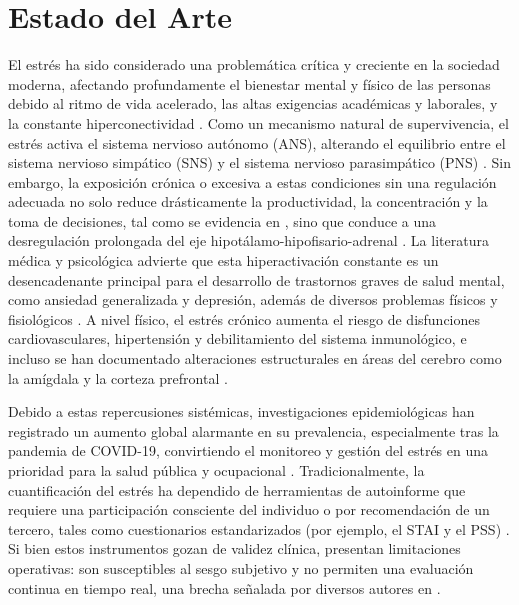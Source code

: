 \chapter{Estado del Arte}

El estrés ha sido considerado una problemática crítica y creciente en la sociedad moderna, afectando profundamente el 
bienestar mental y físico de las personas debido al ritmo de vida acelerado, las altas exigencias académicas y laborales, 
y la constante hiperconectividad \cite{mouadili2025advancing}. Como un mecanismo natural de supervivencia, el estrés activa 
el sistema nervioso autónomo (ANS), alterando el equilibrio entre el sistema nervioso simpático (SNS) y el sistema nervioso 
parasimpático (PNS) \cite{fontes2024enhancing, tao2025emotion_facial}. Sin embargo, la exposición crónica o excesiva a estas
 condiciones sin una regulación adecuada no solo reduce drásticamente la productividad, la concentración y la toma de 
 decisiones, tal como se evidencia en \cite{chatzaki2025overview, mouadili2025advancing}, sino que conduce a una 
 desregulación prolongada del eje hipotálamo-hipofisario-adrenal \cite{chatzaki2025overview}.
La literatura médica y psicológica advierte que esta hiperactivación constante es un desencadenante principal para el 
desarrollo de trastornos graves de salud mental, como ansiedad generalizada y depresión, además de diversos problemas 
físicos y fisiológicos \cite{chatzaki2025overview, mouadili2025advancing, singh2023stress_multi}. A nivel físico, el estrés 
crónico aumenta el riesgo de disfunciones cardiovasculares, hipertensión y debilitamiento del sistema inmunológico, e 
incluso se han documentado alteraciones estructurales en áreas del cerebro como la amígdala y la corteza prefrontal 
\cite{chatzaki2025overview, fontes2024enhancing, mouadili2025advancing, khomidov2024realtime}.

Debido a estas repercusiones sistémicas, investigaciones epidemiológicas han registrado un aumento global alarmante en su 
prevalencia, especialmente tras la pandemia de COVID-19, convirtiendo el monitoreo y gestión del estrés en una prioridad 
para la salud pública y ocupacional \cite{chatzaki2025overview}. Tradicionalmente, la cuantificación del estrés ha dependido 
de herramientas de autoinforme que requiere una participación consciente del individuo o por recomendación de un tercero, tales como cuestionarios estandarizados 
(por ejemplo, el STAI y el PSS) \cite{fontes2024enhancing, morales2022towards}. Si bien estos instrumentos gozan de validez 
clínica, presentan limitaciones operativas: son susceptibles al sesgo subjetivo y no permiten una evaluación continua en 
tiempo real, una brecha señalada por diversos autores en \cite{chatzaki2025overview, fontes2024enhancing, bahameish2024strategies}.

